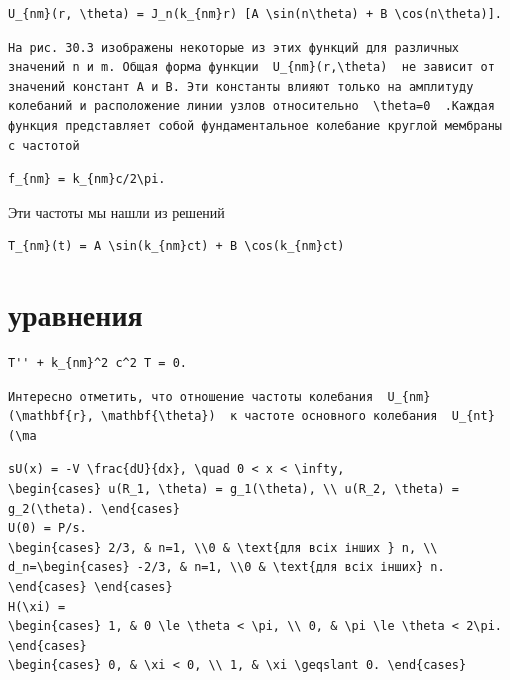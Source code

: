 \documentclass[
  ukrainian,
]{article}
\begin{document}
\begin{verbatim}
U_{nm}(r, \theta) = J_n(k_{nm}r) [A \sin(n\theta) + B \cos(n\theta)].
\end{verbatim}

\begin{verbatim}
На рис. 30.3 изображены некоторые из этих функций для различных значений n и m. Общая форма функции  U_{nm}(r,\theta)  не зависит от значений констант A и B. Эти константы влияют только на амплитуду колебаний и расположение линии узлов относительно  \theta=0  .Каждая функция представляет собой фундаментальное колебание круглой мембраны с частотой
\end{verbatim}

\begin{verbatim}
f_{nm} = k_{nm}c/2\pi.
\end{verbatim}

Эти частоты мы нашли из решений

\begin{verbatim}
T_{nm}(t) = A \sin(k_{nm}ct) + B \cos(k_{nm}ct)
\end{verbatim}

\section{уравнения}\label{ux443ux440ux430ux432ux43dux435ux43dux438ux44f}

\begin{verbatim}
T'' + k_{nm}^2 c^2 T = 0.
\end{verbatim}

\begin{verbatim}
Интересно отметить, что отношение частоты колебания  U_{nm}(\mathbf{r}, \mathbf{\theta})  к частоте основного колебания  U_{nt}(\ma
\end{verbatim}

\begin{verbatim}
sU(x) = -V \frac{dU}{dx}, \quad 0 < x < \infty,
\begin{cases} u(R_1, \theta) = g_1(\theta), \\ u(R_2, \theta) = g_2(\theta). \end{cases}
U(0) = P/s.
\begin{cases} 2/3, & n=1, \\0 & \text{для всіх інших } n, \\ d_n=\begin{cases} -2/3, & n=1, \\0 & \text{для всіх інших} n. \end{cases} \end{cases}
H(\xi) =
\begin{cases} 1, & 0 \le \theta < \pi, \\ 0, & \pi \le \theta < 2\pi. \end{cases}
\begin{cases} 0, & \xi < 0, \\ 1, & \xi \geqslant 0. \end{cases}
\end{verbatim}
\end{document}
